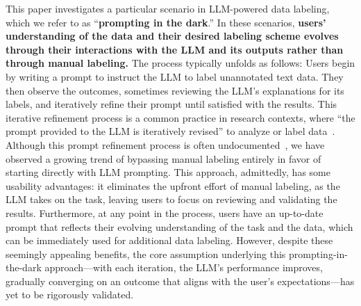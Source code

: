 This paper investigates a particular scenario in LLM-powered data labeling, which we refer to as ``\textbf{prompting in the dark}.'' 
In these scenarios, \textbf{users' understanding of the data and their desired labeling scheme evolves through their interactions with the LLM and its outputs rather than through manual labeling.}
The process typically unfolds as follows: 
Users begin by writing a prompt to instruct the LLM to label unannotated text data. 
They then observe the outcomes, sometimes reviewing the LLM's explanations for its labels, and iteratively refine their prompt until satisfied with the results.
This iterative refinement process is a common practice in research contexts, where ``the prompt provided to the LLM is iteratively revised'' to analyze or label data~\cite{shah2024prompt}.
Although this prompt refinement process is often undocumented~\cite{shah2024prompt}, we have observed a growing trend of bypassing manual labeling entirely in favor of starting directly with LLM prompting. 
This approach, admittedly, has some usability advantages: 
it eliminates the upfront effort of manual labeling, as the LLM takes on the task, leaving users to focus on reviewing and validating the results. 
Furthermore, at any point in the process, users have an up-to-date prompt that reflects their evolving understanding of the task and the data, which can be immediately used for additional data labeling.
However, despite these seemingly appealing benefits, the core assumption underlying this prompting-in-the-dark approach---with each iteration, the LLM's performance improves, gradually converging on an outcome that aligns with the user's expectations---has yet to be rigorously validated.



